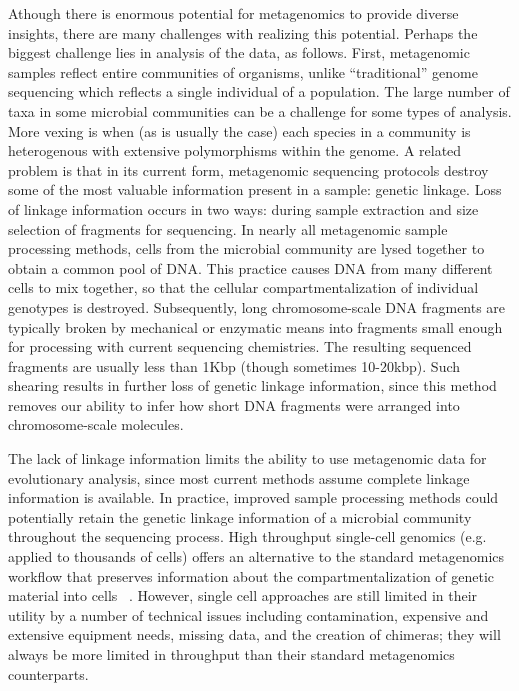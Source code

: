 \documentclass[10pt]{article}
\begin{document}
Athough there is enormous potential for metagenomics to provide diverse insights, there are many challenges with realizing this potential.
Perhaps the biggest challenge lies in analysis of the data, as follows.
First, metagenomic samples reflect entire communities of organisms, unlike ``traditional'' genome sequencing which reflects a single individual of a population.
The large number of taxa in some microbial communities can be a challenge for some types of analysis.
More vexing is when (as is usually the case) each species in a community is heterogenous with extensive polymorphisms within the genome.
A related problem is that in its current form, metagenomic sequencing protocols destroy some of the most valuable information present in a sample: genetic linkage.
Loss of linkage information occurs in two ways: during sample extraction and size selection of fragments for sequencing.
In nearly all metagenomic sample processing methods, cells from the microbial community are lysed together to obtain a common pool of DNA.
This practice causes DNA from many different cells to mix together, so that the cellular compartmentalization of individual genotypes is destroyed.
Subsequently, long chromosome-scale DNA fragments are typically broken by mechanical or enzymatic means into fragments small enough for processing with current sequencing chemistries.
The resulting sequenced fragments are usually less than 1Kbp (though sometimes 10-20kbp).
Such shearing results in further loss of genetic linkage information, since this method removes our ability to infer how short DNA fragments were arranged into chromosome-scale molecules.

The lack of linkage information limits the ability to use metagenomic data for evolutionary analysis, since most current methods assume complete linkage information is available.
In practice, improved sample processing methods could potentially retain the genetic linkage information of a microbial community throughout the sequencing process.
High throughput single-cell genomics (e.g. applied to thousands of cells) offers an alternative to the standard metagenomics workflow that preserves information about the compartmentalization of genetic material into cells ~\cite{Woyke2010}.
However, single cell approaches are still limited in their utility by a number of technical issues including contamination, expensive and extensive equipment needs, missing data, and the creation of chimeras; they will always be more limited in throughput than their standard metagenomics counterparts.
\end{document}

